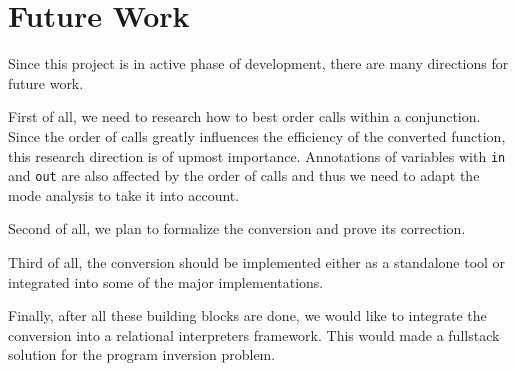 \section{Future Work}

Since this project is in active phase of development, there are many directions for future work.

First of all, we need to research how to best order calls within a conjunction.
Since the order of calls greatly influences the efficiency of the converted function, this research direction is of upmost importance.
Annotations of variables with \lstinline{in} and \lstinline{out} are also affected by the order of calls and thus we need to adapt the mode analysis to take it into account.

Second of all, we plan to formalize the conversion and prove its correction.

Third of all, the conversion should be implemented either as a standalone tool or  integrated into some of the major \mk implementations.

Finally, after all these building blocks are done, we would like to integrate the conversion into a relational interpreters framework.
This would made a fullstack solution for the program inversion problem.